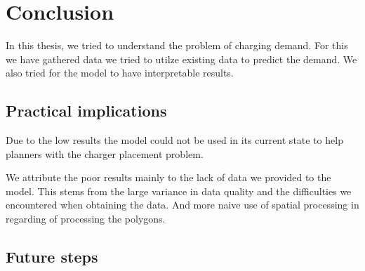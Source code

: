 \chapter{Conclusion}

In this thesis, we tried to understand the problem of charging demand. For this we have gathered data we tried to utilze existing data to predict the demand. We also tried for the model to have interpretable results.


\section{Practical implications}

Due to the low results the model could not be used in its current state to help planners with the charger placement problem.

We attribute the poor results mainly to the lack of data we provided to the model. This stems from the large variance in data quality and the difficulties we encountered when obtaining the data. And more naive use of spatial processing in regarding of processing the polygons.


\section{Future steps}


